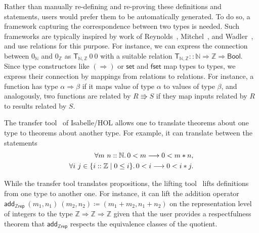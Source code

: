 \documentclass{article}
\theoremstyle{definition}
\newcommand{\bool}{\mathsf{Bool}}
\newcommand{\nat}{\mathbb{N}}
\newcommand{\inte}{\mathbb{Z}}
\begin{document}
Rather than manually re-defining and re-proving
these definitions and statements,
users would prefer them to be automatically generated.
To do so, a framework capturing the correspondence between two types is needed.
Such frameworks are typically inspired by work of Reynolds~\cite{reynolds1983types}, Mitchel~\cite{mitchell1986representation}, and Wadler~\cite{wadler1989theorems},
and use relations for this purpose.
For instance, we can express the connection between \(0_\nat\) and \(0_\inte\) as \(\mathsf{T}_{\nat, \inte}\ 0\ 0\) with a suitable relation \(\mathsf{T}_{\nat, \inte} :: \nat\Rightarrow\inte\Rightarrow\bool\).
Since type constructors like \((\Rightarrow)\) or \(\mathsf{set}\) and \(\mathsf{fset}\) map types to types, we express their connection by mappings from relations to relations. For instance, a function has type \(\alpha \Rightarrow \beta\) if it maps value of type \(\alpha\) to values of type \(\beta\),
and analogously, two functions are related by \(R \Rrightarrow S\) if they map inputs related by \(R\) to results related by \(S\).

The transfer tool~\cite{huffman2013lifting} of Isabelle/HOL allows one to translate theorems about one type to theorems about another type.
For example, it can translate between the statements
\begin{align*}
  \forall m\ n :: \nat\ldotp 0 < m \longrightarrow 0 < m * n,\\
\forall i\ j \in \{i :: \inte \mid 0 \leq i\}\ldotp 0 < i \longrightarrow 0 < i * j.
\end{align*}

While the transfer tool translates propositions,
the lifting tool~\cite{huffman2013lifting} lifts definitions from one type to another one.
For instance, it can lift the addition operator \(\mathsf{add_{\inte rep}}\ (m_1, n_1)\ (m_2, n_2) \coloneqq (m_1 + m_2, n_1 + n_2)\)
on the representation level of integers to the type
\(\inte \Rightarrow \inte \Rightarrow \inte\)
given that the user provides a respectfulness theorem that \(\mathsf{add_{\inte rep}}\) respects the equivalence classes of the quotient.
\end{document}
